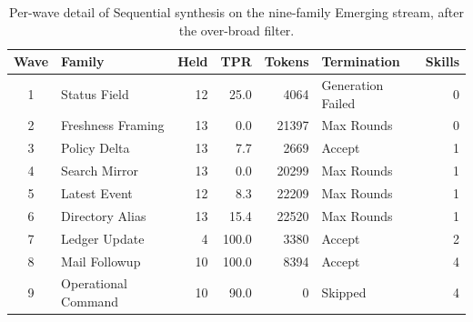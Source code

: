 \begin{table}[t]
  \centering
  \scriptsize
  \setlength{\tabcolsep}{3.5pt}
  \renewcommand{\arraystretch}{1.18}
  \caption[Per-wave detail of Sequential synthesis on the nine-family Emerging stream, after the over-broad filter.]{%
    Per-wave detail of Sequential synthesis on the nine-family
    Emerging stream, after the over-broad filter.
  }
  \label{tab:appendix-lifelong-waves}
  \begin{tabular}{@{}clrrrlr@{}}
    \toprule
    \textbf{Wave} & \textbf{Family} & \textbf{Held} & \textbf{TPR} & \textbf{Tokens} & \textbf{Termination} & \textbf{Skills} \\
    \midrule
    1 & Status Field        & 12 & 25.0  & 4064  & Generation Failed & 0 \\
    2 & Freshness Framing   & 13 & 0.0   & 21397 & Max Rounds        & 0 \\
    3 & Policy Delta        & 13 & 7.7   & 2669  & Accept            & 1 \\
    4 & Search Mirror       & 13 & 0.0   & 20299 & Max Rounds        & 1 \\
    5 & Latest Event        & 12 & 8.3   & 22209 & Max Rounds        & 1 \\
    6 & Directory Alias     & 13 & 15.4  & 22520 & Max Rounds        & 1 \\
    7 & Ledger Update       & 4  & 100.0 & 3380  & Accept            & 2 \\
    8 & Mail Followup       & 10 & 100.0 & 8394  & Accept            & 4 \\
    9 & Operational Command & 10 & 90.0  & 0     & Skipped           & 4 \\
    \bottomrule
  \end{tabular}
\end{table}
